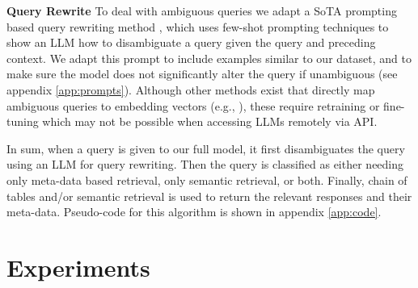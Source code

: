 \documentclass{article}
\begin{document}

\textbf{Query Rewrite} To deal with ambiguous queries we adapt a SoTA prompting based query rewriting method \cite{mao2023large}, which uses few-shot prompting techniques to show an LLM how to disambiguate a query given the query and preceding context. We adapt this prompt to include examples similar to our dataset, and to make sure the model does not significantly alter the query if unambiguous (see appendix \ref{app:prompts}). Although other methods exist that directly map ambiguous queries to embedding vectors (e.g., \cite{mo2023learning}), these require retraining or fine-tuning which may not be possible when accessing LLMs remotely via API.

In sum, when a query is given to our full model, it first disambiguates the query using an LLM for query rewriting. Then the query is classified as either needing only meta-data based retrieval, only semantic retrieval, or both. Finally, chain of tables and/or semantic retrieval is used to return the relevant responses and their meta-data. Pseudo-code for this algorithm is shown in appendix \ref{app:code}.

\section{Experiments}
\end{document}

